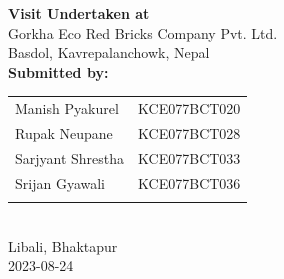 \begin{center}
	\large{\textbf{Visit Undertaken at}\\}
		\normalsize{Gorkha Eco Red Bricks Company Pvt. Ltd.\\
		Basdol, Kavrepalanchowk, Nepal\\
		}
		\vspace{0.5in}
	\large{\textbf{Submitted by:}}\\
	\vspace{0.2cm}
	\begin{tabular}{p{3in}p{1.2in}}
		\hspace{0.3cm}Manish Pyakurel & KCE077BCT020\\
		\hspace{0.3cm}Rupak Neupane & KCE077BCT028\\
		\hspace{0.3cm}Sarjyant Shrestha & KCE077BCT033\\
		\hspace{0.3cm}Srijan Gyawali & KCE077BCT036\\
	 \vspace{0.2in}
	\end{tabular}
	\\
		\vspace{0.4in}
		\normalsize{Libali, Bhaktapur\\
		2023-08-24	
	}
\end{center}


  